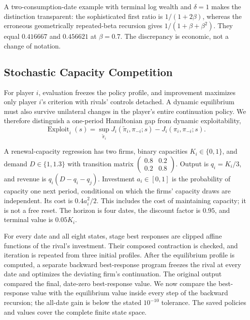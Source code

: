 A two-consumption-date example with terminal log wealth and $\delta=1$ makes the distinction transparent: the sophisticated first ratio is $1/(1+2\beta)$, whereas the erroneous geometrically repeated-beta recursion gives $1/(1+\beta+\beta^2)$. They equal $0.416667$ and $0.456621$ at $\beta=0.7$. The discrepancy is economic, not a change of notation.

\subsection{Stochastic Capacity Competition}
For player $i$, evaluation freezes the policy profile, and improvement maximizes only player $i$'s criterion with rivals' controls detached. A dynamic equilibrium must also survive unilateral changes in the player's entire continuation policy. We therefore distinguish a one-period Hamiltonian gap from dynamic exploitability,
\begin{equation}
 \operatorname{Exploit}_i(s)=\sup_{\widetilde\pi_i}
 J_i(\widetilde\pi_i,\pi_{-i};s)-J_i(\pi_i,\pi_{-i};s).
 \label{eq:exploit}
\end{equation}

A renewal-capacity regression has two firms, binary capacities $K_i\in\{0,1\}$, and demand $D\in\{1,1.3\}$ with transition matrix
$\left(\begin{smallmatrix}0.8&0.2\\0.2&0.8\end{smallmatrix}\right)$.
Output is $q_i=K_i/3$, and revenue is $q_i(D-q_i-q_j)$. Investment $a_i\in[0,1]$ is the probability of capacity one next period, conditional on which the firms' capacity draws are independent. Its cost is $0.4a_i^2/2$. This includes the cost of maintaining capacity; it is not a free reset. The horizon is four dates, the discount factor is $0.95$, and terminal value is $0.05K_i$.

For every date and all eight states, stage best responses are clipped affine functions of the rival's investment. Their composed contraction is checked, and iteration is repeated from three initial profiles. After the equilibrium profile is computed, a separate backward best-response program freezes the rival at every date and optimizes the deviating firm's continuation. The original output compared the final, date-zero best-response value. We now compare the best-response value with the equilibrium value inside every step of the backward recursion; the all-date gain is below the stated $10^{-10}$ tolerance. The saved policies and values cover the complete finite state space.

